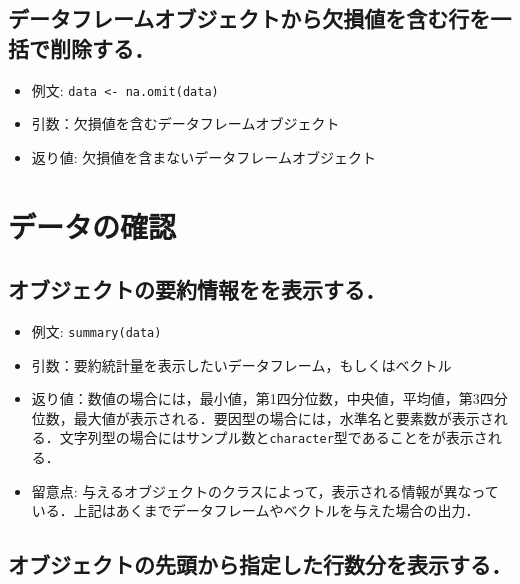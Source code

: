 \documentclass[
  xelatex, ja=standard]{bxjsarticle}
\providecommand{\tightlist}{%
  \setlength{\itemsep}{0pt}\setlength{\parskip}{0pt}}
\begin{document}
\subsection{データフレームオブジェクトから欠損値を含む行を一括で削除する．}\label{ux30c7ux30fcux30bfux30d5ux30ecux30fcux30e0ux30aaux30d6ux30b8ux30a7ux30afux30c8ux304bux3089ux6b20ux640dux5024ux3092ux542bux3080ux884cux3092ux4e00ux62ecux3067ux524aux9664ux3059ux308b}

\begin{itemize}
\tightlist
\item
  例文: \texttt{data\ \textless{}-\ na.omit(data)}
\item
  引数：欠損値を含むデータフレームオブジェクト
\item
  返り値: 欠損値を含まないデータフレームオブジェクト
\end{itemize}

\section{データの確認}\label{ux30c7ux30fcux30bfux306eux78baux8a8d}

\subsection{オブジェクトの要約情報をを表示する．}\label{ux30aaux30d6ux30b8ux30a7ux30afux30c8ux306eux8981ux7d04ux60c5ux5831ux3092ux3092ux8868ux793aux3059ux308b}

\begin{itemize}
\tightlist
\item
  例文: \texttt{summary(data)}
\item
  引数：要約統計量を表示したいデータフレーム，もしくはベクトル
\item
  返り値：数値の場合には，最小値，第1四分位数，中央値，平均値，第3四分位数，最大値が表示される．要因型の場合には，水準名と要素数が表示される．文字列型の場合にはサンプル数と\texttt{character}型であることをが表示される．
\item
  留意点:
  与えるオブジェクトのクラスによって，表示される情報が異なっている．上記はあくまでデータフレームやベクトルを与えた場合の出力．
\end{itemize}

\subsection{オブジェクトの先頭から指定した行数分を表示する．}\label{ux30aaux30d6ux30b8ux30a7ux30afux30c8ux306eux5148ux982dux304bux3089ux6307ux5b9aux3057ux305fux884cux6570ux5206ux3092ux8868ux793aux3059ux308b}
\end{document}

